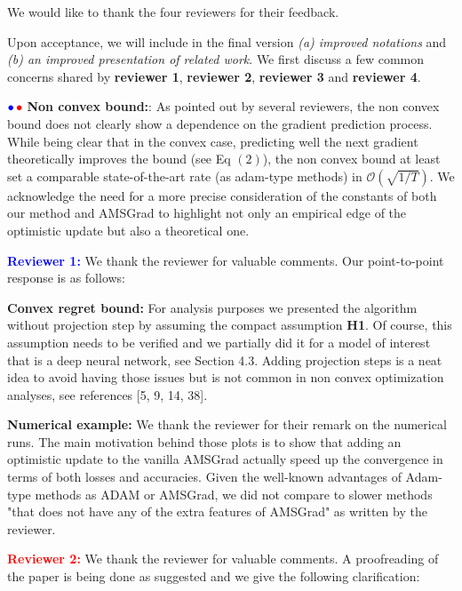 \documentclass{article}
\begin{document}
We would like to thank the four reviewers for their feedback. 

Upon acceptance, we will include in the final version \emph{{\sf (a)} improved notations} and \emph{{\sf (b)} an improved presentation of related work}. 
We first discuss a few common concerns shared by \textbf{\color{blue}reviewer 1}, \textbf{\color{red} reviewer 2}, \textbf{\color{green!50!black}reviewer 3} and \textbf{\color{yellow!50!black}reviewer 4}.



${\color{blue}\bullet}\!~{\color{red}\bullet}$ \textbf{Non convex bound:}: 
As pointed out by several reviewers, the non convex bound does not clearly show a dependence on the gradient prediction process.
While being clear that in the convex case, predicting well the next gradient theoretically improves the bound (see Eq $(2)$), the non convex bound at least set a comparable state-of-the-art rate (as adam-type methods) in $\mathcal{O}( \sqrt{1/T} )$.
We acknowledge the need for a more precise consideration of the constants of both our method and AMSGrad to highlight not only an empirical edge of the optimistic update but also a theoretical one.


\textbf{\textcolor{blue}{Reviewer 1:}} We thank the reviewer for valuable comments. Our point-to-point response is as follows:


\textbf{Convex regret bound:} 
For analysis purposes we presented the algorithm without projection step by assuming the compact assumption \textbf{H1}.
Of course, this assumption needs to be verified and we partially did it for a model of interest that is a deep neural network, see Section 4.3.
Adding projection steps is a neat idea to avoid having those issues but is not common in non convex optimization analyses, see references [5, 9, 14, 38].

\textbf{Numerical example:} We thank the reviewer for their remark on the numerical runs. 
The main motivation behind those plots is to show that adding an optimistic update to the vanilla AMSGrad actually speed up the convergence in terms of both losses and accuracies.
Given the well-known advantages of Adam-type methods as ADAM or AMSGrad, we did not compare to slower methods "that does not have any of the extra features of AMSGrad" as written by the reviewer.


\textbf{\textcolor{red}{Reviewer 2:}} We thank the reviewer for valuable comments. A proofreading of the paper is being done as suggested and we give the following clarification:
\end{document}
